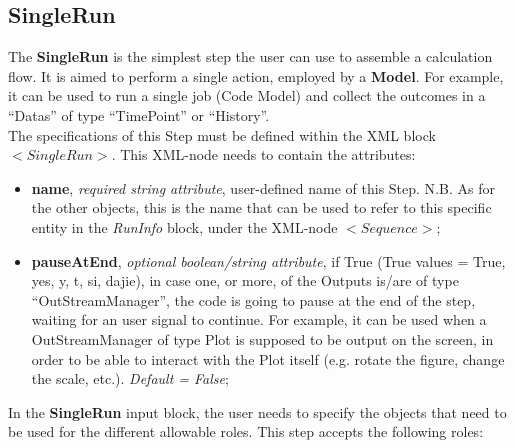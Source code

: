 \subsection{SingleRun}
\label{subsec:stepSingleRun}
The  \textbf{SingleRun} is the simplest step the user can use to assemble a calculation flow. It is aimed to perform a single  action, employed by a \textbf{Model}. For example, it can be used to run a single job (Code Model) and collect the outcomes in a ``Datas'' of type ``TimePoint'' or ``History''.
\\ The specifications of this Step must be defined within the XML block $<SingleRun>$. This XML-node needs to contain the attributes:
\vspace{-5mm}
\begin{itemize}
\itemsep0em
\item \textbf{name}, \textit{required string attribute}, user-defined name of this Step. N.B. As for the other objects, this is the name that can be used to refer to this specific entity in the \textit{RunInfo} block, under the XML-node $<Sequence>$;
\item \textbf{pauseAtEnd}, \textit{optional boolean/string attribute}, if True (True values = True, yes, y, t, si, dajie), in case one, or more, of the Outputs is/are of type ``OutStreamManager'', the code is going to pause at the end of the step, waiting for an user signal to continue. For example, it can be used when a OutStreamManager of type Plot is supposed to be output on the screen, in order to be able to interact with the Plot itself (e.g. rotate the figure, change the scale, etc.).  \textit{Default = False};
\end{itemize}
\vspace{-5mm}
In the \textbf{SingleRun} input block, the user needs to specify the objects that need to be used for the different allowable roles. This step accepts the following roles:
